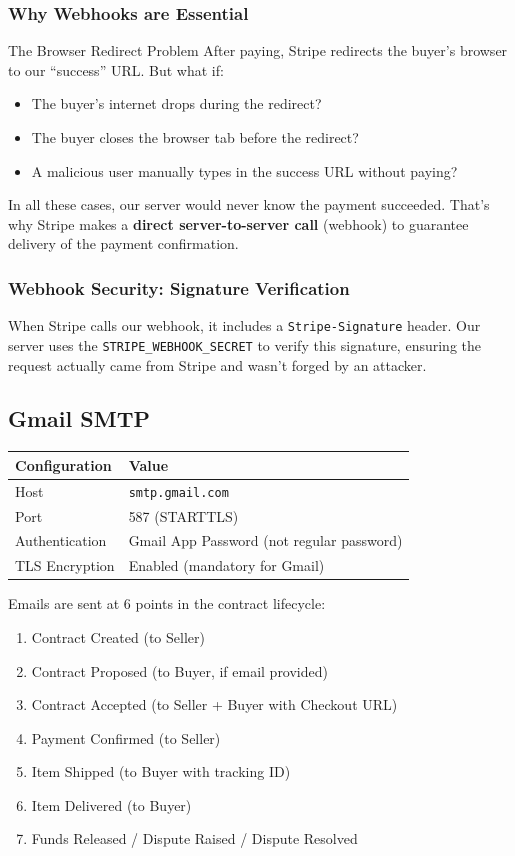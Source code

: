 \documentclass[11pt, a4paper]{article}
\begin{document}
\subsubsection{Why Webhooks are Essential}

\begin{conceptbox}{The Browser Redirect Problem}
After paying, Stripe redirects the buyer's browser to our ``success'' URL. But what if:
\begin{itemize}
    \item The buyer's internet drops during the redirect?
    \item The buyer closes the browser tab before the redirect?
    \item A malicious user manually types in the success URL without paying?
\end{itemize}
In all these cases, our server would never know the payment succeeded. That's why Stripe makes a \textbf{direct server-to-server call} (webhook) to guarantee delivery of the payment confirmation.
\end{conceptbox}

\subsubsection{Webhook Security: Signature Verification}

When Stripe calls our webhook, it includes a \texttt{Stripe-Signature} header. Our server uses the \texttt{STRIPE\_WEBHOOK\_SECRET} to verify this signature, ensuring the request actually came from Stripe and wasn't forged by an attacker.

\subsection{Gmail SMTP}

\begin{longtable}{@{}lp{8cm}@{}}
\toprule
\textbf{Configuration} & \textbf{Value} \\
\midrule
Host & \texttt{smtp.gmail.com} \\
Port & 587 (STARTTLS) \\
Authentication & Gmail App Password (not regular password) \\
TLS Encryption & Enabled (mandatory for Gmail) \\
\bottomrule
\end{longtable}

Emails are sent at 6 points in the contract lifecycle:
\begin{enumerate}
    \item Contract Created (to Seller)
    \item Contract Proposed (to Buyer, if email provided)
    \item Contract Accepted (to Seller + Buyer with Checkout URL)
    \item Payment Confirmed (to Seller)
    \item Item Shipped (to Buyer with tracking ID)
    \item Item Delivered (to Buyer)
    \item Funds Released / Dispute Raised / Dispute Resolved
\end{enumerate}
\end{document}
